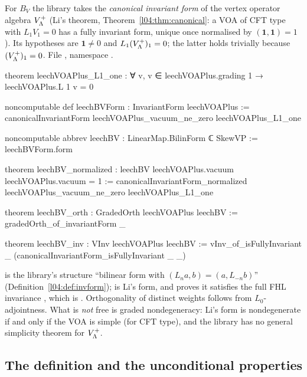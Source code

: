 For $B_V$ the library takes the \emph{canonical invariant form} of the vertex operator algebra
$V_{\Lambda}^{+}$ (Li's theorem, Theorem~\ref{l04:thm:canonical}: a VOA of CFT type with $L_1V_1=0$ has a
fully invariant form, unique once normalised by $(\mathbf1,\mathbf1)=1$). Its hypotheses are
$\mathbf1\neq0$ and $L_1(V_{\Lambda}^{+})_1=0$; the latter holds trivially because $(V_{\Lambda}^{+})_1=0$.
File , namespace .
\begin{leancode}
theorem leechVOAPlus_L1_one : ∀ v, v ∈ leechVOAPlus.grading 1 → leechVOAPlus.L 1 v = 0

noncomputable def leechBVForm : InvariantForm leechVOAPlus :=
  canonicalInvariantForm leechVOAPlus_vacuum_ne_zero leechVOAPlus_L1_one

noncomputable abbrev leechBV : LinearMap.BilinForm ℂ SkewVP := leechBVForm.form

theorem leechBV_normalized : leechBV leechVOAPlus.vacuum leechVOAPlus.vacuum = 1 :=
  canonicalInvariantForm_normalized leechVOAPlus_vacuum_ne_zero leechVOAPlus_L1_one

theorem leechBV_orth : GradedOrth leechVOAPlus leechBV := gradedOrth_of_invariantForm _

theorem leechBV_inv : VInv leechVOAPlus leechBV :=
  vInv_of_isFullyInvariant _ (canonicalInvariantForm_isFullyInvariant _ _)
\end{leancode}
\begin{dictionary}
 is the library's structure ``bilinear form with
$(L_na,b)=(a,L_{-n}b)$'' (Definition~\ref{l04:def:invform});  is Li's form, and
 proves it satisfies the full FHL invariance
, which is . Orthogonality of distinct weights follows from
$L_0$-adjointness. What is \emph{not} free is graded nondegeneracy: Li's form is nondegenerate if
and only if the VOA is simple (for CFT type), and the library has no general simplicity theorem
for $V_{\Lambda}^{+}$.
\end{dictionary}

\subsection{The definition and the unconditional properties}

